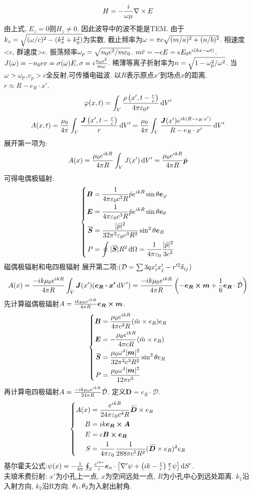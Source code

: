 \documentclass[UTF8,9pt]{ctexart}
\begin{document}
$$H=-\frac{i}{\omega\mu}\nabla\times E$$
由上式, $E_z=0$则$H_z\neq 0$. 因此波导中的波不能是TEM. 由于$k_z=\sqrt{(\omega/c)^2-(k_x^2+k_y^2)}$为实数, 截止频率为$\omega=\pi c\sqrt{(m/a)^2+(n/b)^2}$. 相速度<c, 群速度>c.
振荡频率$\omega_p=\sqrt{n_0e^2/m\varepsilon_0}$. $m\ddot{r}=-eE=eE_0e^{i(kx-\omega t)}$. $J(\omega)=-n_0ev=\sigma(\omega)E,\sigma=i\frac{n_0e^2}{m\omega}$. 稀薄等离子折射率为$n=\sqrt{1-\omega_p^2/\omega^2}$. 当$\omega>\omega_p$,$v_p>c$全反射,可传播电磁波. 
以$R$表示原点$x'$到场点$x$的距离. $r\approx R-e_R\cdot x'$. 
$$\varphi(x,t)=\int_V\frac{\rho\left( x',t-\frac{r}{c} \right)}{4\pi\varepsilon_0r}\mathop{}\!\mathrm{d} V'$$
$$A(x,t)=\frac{\mu_0}{4\pi}\int_V\frac{\bm{J}\left( x',t-\frac{r}{c} \right)}{r}\mathop{}\!\mathrm{d} V'=\frac{\mu_0}{4\pi}\int_V\frac{\bm{J}(x')e^{ik(R-e_R\cdot x')}}{R-e_R\cdot x'}\mathop{}\!\mathrm{d} V'$$
展开第一项为:
$$A(x)=\frac{\mu_0e^{ikR}}{4\pi R}\int_VJ(x')\mathop{}\!\mathrm{d} V'=\frac{\mu_0e^{ikR}}{4\pi R}\dot{\bm{p}}$$
可得电偶极辐射:
$$\left\{\begin{aligned} 
    \bm{B}&=\frac{1}{4\pi\varepsilon_0c^3R}\ddot{p}e^{ikR}\sin\theta \bm{e}_\varphi\\
    \bm{E}&=\frac{1}{4\pi\varepsilon_0c^3R}\ddot{p}e^{ikR}\sin\theta \bm{e}_\theta\\
    \overline{\bm{S}} &= \frac{|\ddot{p}|^2}{32\pi^2\varepsilon_0c^3R^2}\sin^2\theta\bm{e}_R\\
    P &= \oint|\overline{\bm{S}}|R^2\mathop{}\!\mathrm{d}\Omega = \frac{1}{4\pi\varepsilon_0}\frac{|\ddot{p}|^2}{3c^3}
 \end{aligned}\right.$$
磁偶极辐射和电四极辐射
展开第二项:($\mathcal{D}=\sum 3qx'_ix'_j-r'^2\delta_{ij}$)
$$A(x)=\frac{-ik\mu_0e^{ikR}}{4\pi R}\int_V\bm{J}(x')(\bm{e_R\cdot x'}\mathop{}\!\mathrm{d} V')=\frac{-ik\mu_0e^{ikR}}{4\pi R}\left( -\bm{e_R\times m}+\frac{1}{6}\bm{e_R}\cdot\dot{\mathcal{D}} \right)$$
先计算磁偶极辐射$A=\frac{ik\mu_0e^{ikR}}{4\pi R}\bm{e_R\times m}$.
$$\left\{\begin{aligned} 
    \bm{B} &= \frac{\mu_0e^{ikR}}{4\pi c^2R}(\ddot{m}\times e_R)e_R\\
    \bm{E} &= -\frac{\mu_0e^{ikR}}{4\pi cR}(\ddot{m}\times e_R)\\
    \bm{\overline{S}} &= \frac{\mu_0\omega^4|\bm{m}|^2}{32\pi^2c^3R^2}\sin^2\theta e_R\\
    P&= \frac{\mu_0\omega^4|\bm{m}|^2}{12\pi c^3}
 \end{aligned}\right.$$
再计算电四极辐射$A=\frac{-ik\mu_0e^{ikR}}{24\pi R}\dot{\mathcal{D}}$. 定义$\bm{D}=e_R\cdot \mathcal{D}$. 
$$\left\{\begin{aligned} 
    A(x) &= \frac{e^{ikR}}{24\pi\varepsilon_0c^4R}\dddot{\bm{D}}\times e_R\\
    B &= ik\bm{e_R\times A}\\
    E &= c\bm{B\times{e_R}}\\
    S &= \frac{1}{4\pi\varepsilon_0}\frac{1}{288\pi c^5R^2}(\dddot{\bm{D}}\times e_R)^2e_R
 \end{aligned}\right.$$
基尔霍夫公式:$\psi(x)=-\frac{1}{4\pi}\oint_S\frac{e^{ikr}}{r}\bm{e}_n\cdot\left[\nabla'\psi+\left( ik-\frac{1}{r} \right)\frac{\bm{r}}{r}\psi\right]\mathop{}\!\mathrm{d} S'$.\\
夫琅禾费衍射: $x'$为小孔上一点, $x$为空间远处一点, $R$为小孔中心到远处距离. $k_1$沿入射方向, $k_2$沿R方向. $\theta_1,\theta_2$为入射出射角. 
\end{document}
